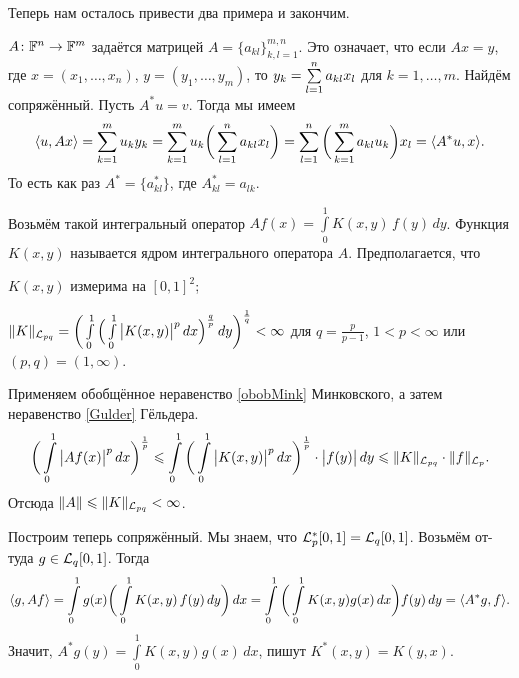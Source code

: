 Теперь нам осталось привести два примера и закончим.
\begin{Exa}
  $A\colon \mathbb F^n\rightarrow\mathbb F^m$ задаётся матрицей $A = \{a_{kl}\}_{k,l=1}^{m,n}$. Это означает, что если $Ax=y$, где $x = (x_1,\dots,x_n)$, $y = (y_1,\dots,y_m)$, то $y_k = \sum\limits_{l = 1}^{n} a_{kl}x_l$ для $k=1,\dots,m$. Найдём сопряжённый. Пусть $A^*u=v$. Тогда мы имеем
\[
  \langle u,Ax\rangle = \sum\limits_{k = 1}^{m} u_ky_k=\sum\limits_{k = 1}^{m} u_k\bigg(\sum\limits_{l = 1}^{n} a_{kl}x_l\bigg) = 
  \sum\limits_{l = 1}^{n}\bigg(\sum\limits_{k = 1}^{m} a_{kl} u_k\bigg)x_l = \langle A^*u,x\rangle.
\]
То есть как раз $A^* = \{a_{kl}^*\}$, где $A^*_{kl} = a_{lk}$.
\end{Exa}
\begin{Exa}
  Возьмём такой интегральный оператор $Af(x) = \int\limits_0^1K(x,y)\,f(y)\,dy$. Функция $K(x,y)$ называется ядром интегрального оператора $A$. Предполагается, что
\begin{roItems}
\item $K(x,y)$ измерима на $[0,1]^2$;
\item $\|K\|_{\mathcal L_{pq}} = \bigg(\int\limits_0^1\Big(\int\limits_0^1\big|K(x,y)\big|^p\,dx\Big)^{\frac qp}\,dy\bigg)^{\frac 1q}<\infty$ для $q = \frac p{p-1}$, $1<p<\infty$ или $(p,q) = (1,\infty)$.
\end{roItems}
\end{Exa}
\begin{Proof}
  Применяем обобщённое неравенство \ref{obobMink} Минковского, а затем неравенство \ref{Gulder} Гёльдера.
\[
  \bigg(\int\limits_0^1\big|A f(x)\big|^p\,dx\bigg)^{\frac 1p}\leqslant 
  \int\limits_0^1\bigg(\int\limits_0^1\big|K(x,y)\big|^p\,dx\bigg)^{\frac1p}\cdot \big|f(y)\big|\,dy\leqslant \|K\|_{\mathcal L_{pq}}\cdot \|f\|_{\mathcal L_p}.
\]
Отсюда $\|A\|\leqslant \|K\|_{\mathcal L_{pq}}<\infty$.

Построим теперь сопряжённый. Мы знаем, что $\mathcal L_p^*[0,1] = \mathcal L_q[0,1]$. Возьмём от-туда $g\in\mathcal L_q[0,1]$. Тогда 
\[
  \langle g,Af\rangle = \int\limits_0^1 g(x)\bigg( \int\limits_0^1 K(x,y)\,f(y)\,dy\bigg)\,dx = 
  \int\limits_0^1\bigg(\int\limits_0^1 K(x,y)g(x)\,dx\bigg)f(y)\,dy = \langle A^*g,f\rangle.
\]
Значит, $A^*g(y) = \int\limits_0^1 K(x,y) g(x)\,dx$, пишут $K^*(x,y)  = K(y,x)$.
\end{Proof}
